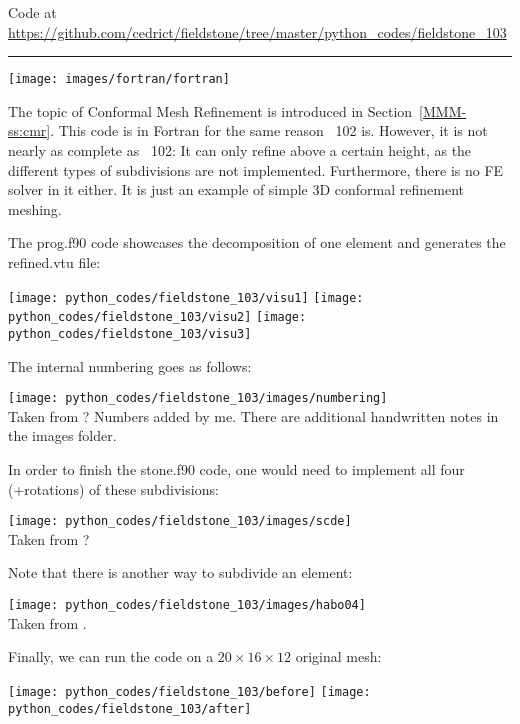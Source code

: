 

\begin{center}
Code at \url{https://github.com/cedrict/fieldstone/tree/master/python_codes/fieldstone_103}
\end{center}

\par\noindent\rule{\textwidth}{0.4pt}


\begin{center}
\texttt{[image: images/fortran/fortran]} 
\end{center}

The topic of Conformal Mesh Refinement is introduced in Section~\ref{MMM-ss:cmr}.
This code is in Fortran for the same reason \stone~102 is. 
However, it is not nearly as complete as \stone~102: It can only refine 
above a certain height, as the different types of subdivisions are not implemented.
Furthermore, there is no FE solver in it either. It is just an example of 
simple 3D conformal refinement meshing.

The {\filenamefont prog.f90} code showcases the decomposition of one element and generates
the {\filenamefont refined.vtu} file:
\begin{center}
\texttt{[image: python\_codes/fieldstone\_103/visu1]}
\texttt{[image: python\_codes/fieldstone\_103/visu2]}
\texttt{[image: python\_codes/fieldstone\_103/visu3]}
\end{center}
The internal numbering goes as follows:
\begin{center}
\texttt{[image: python\_codes/fieldstone\_103/images/numbering]}\\
{\captionfont Taken from ? Numbers added by me. There are additional handwritten notes
in the images folder.}
\end{center}

In order to finish the {\filenamefont stone.f90} code, one would need to 
implement all four (+rotations) of these subdivisions:
\begin{center}
\texttt{[image: python\_codes/fieldstone\_103/images/scde]}\\
{\captionfont Taken from ?}
\end{center}

Note that there is another way to subdivide an element:
\begin{center}
\texttt{[image: python\_codes/fieldstone\_103/images/habo04]}\\
{\captionfont Taken from \cite{habo04}.}
\end{center}

Finally, we can run the code on a $20\times16\times12$ original mesh:
\begin{center}
\texttt{[image: python\_codes/fieldstone\_103/before]}
\texttt{[image: python\_codes/fieldstone\_103/after]}
\end{center}

